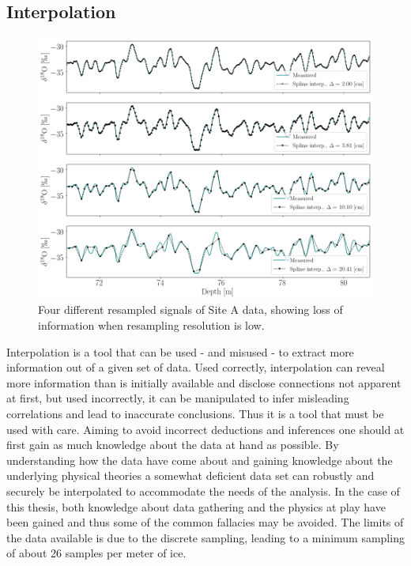 \documentclass[../../CompleteThesis2/Complete_2ndDraft]{subfiles}
\begin{document}
\subsection[Interpolation][Interpolation]{Interpolation}
\label{Subsec:CompMeths_SplinesAndInterpolation_Interpolation}
\begin{figure}[h]
	\centering
	\includegraphics[width=\textwidth]{SiteA_MultiSplineInterp.png}
	\caption[Different resamplings of Site A.]{\small Four different resampled signals of Site A data, showing loss of information when resampling resolution is low.}
	\label{Fig:COMPMETH_SiteA_MultiSplineInterp}
\end{figure}
Interpolation is a tool that can be used - and misused - to extract more information out of a given set of data. Used correctly, interpolation can reveal more information than is initially available and disclose connections not apparent at first, but used incorrectly, it can be manipulated to infer misleading correlations and lead to inaccurate conclusions. Thus it is a tool that must be used with care. Aiming to avoid incorrect deductions and inferences one should at first gain as much knowledge about the data at hand as possible. By understanding how the data have come about and gaining knowledge about the underlying physical theories a somewhat deficient data set can robustly and securely be interpolated to accommodate the needs of the analysis. In the case of this thesis, both knowledge about data gathering and the physics at play have been gained and thus some of the common fallacies may be avoided. The limits of the data available is due to the discrete sampling, leading to a minimum sampling of about 26 samples per meter of ice.
\end{document}
